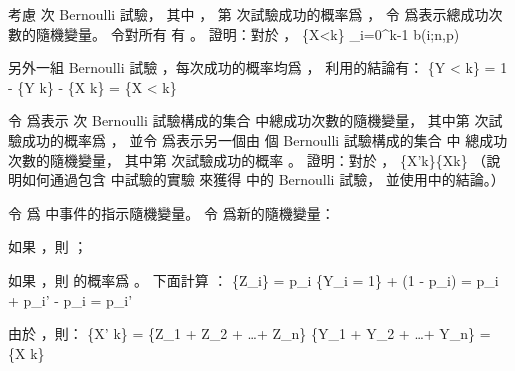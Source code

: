 \startEXERCISE
考慮  次 Bernoulli 試驗，
其中 ，
第  次試驗成功的概率爲 ，
令  爲表示總成功次數的隨機變量。
令對所有  有 。
證明：對於 ，
\startformula
\Pr\{X<k\} \ge \sum_{i=0}^{k-1} b(i;n,p)
\stopformula
\stopEXERCISE

\startANSWER
另外一組 Bernoulli 試驗 ，每次成功的概率均爲 ，
利用\inexercise[C.4-9] 的結論有：
\startformula
\Pr\{Y < k\} = 1 - \Pr\{Y \ge k\}  - \Pr\{X \ge k\} = \Pr\{X < k\}
\stopformula
\stopANSWER

\startEXERCISE[exercise:C.4-9]\DIFFICULT
令  爲表示  次 Bernoulli 試驗構成的集合  中總成功次數的隨機變量，
其中第  次試驗成功的概率爲 ，
並令  爲表示另一個由  個 Bernoulli 試驗構成的集合  中
總成功次數的隨機變量，
其中第  次試驗成功的概率 。
證明：對於 ，
\startformula
\Pr\{X'\ge k\}\ge \Pr\{X\ge k\}
\stopformula
（\hint 說明如何通過包含  中試驗的實驗
來獲得  中的 Bernoulli 試驗，
並使用\inexercise[C.3-7] 中的結論。）
\stopEXERCISE

\startANSWER
令  爲  中事件的指示隨機變量。
令  爲新的隨機變量：
\startigBase[a]
\item 如果 ，則 ；
\item 如果 ，則  的概率爲 。
\stopigBase
下面計算 ：
\startformula
\Pr\{Z_i\} = p_i \Pr\{Y_i = 1\} + (1 - p_i) \cdot {}
                = p_i + p_i' - p_i
                = p_i'
\stopformula

由於 ，則：
\startformula
\Pr\{X' \ge k\} = \Pr\{Z_1 + Z_2 + \ldots + Z_n\}
                \ge \Pr\{Y_1 + Y_2 + \ldots + Y_n\}
                = \Pr\{X \ge k\}
\stopformula
\stopANSWER

\stopsection
